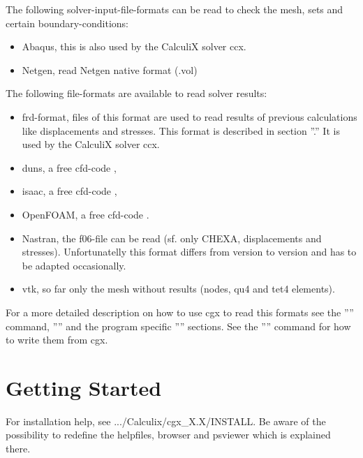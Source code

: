 \documentclass{article}
\begin{document}
The following solver-input-file-formats can be read to check the mesh, sets and certain boundary-conditions:
\begin{itemize}
\item Abaqus, this is also used by the CalculiX solver ccx.
\item Netgen, read Netgen native format (.vol)
\end{itemize}
The following file-formats are available to read solver results:
\begin{itemize}
\item frd-format, files of this format are used to read results of previous calculations like displacements and stresses. This format is described in section ''.'' It is used by the CalculiX solver ccx. 
\item duns, a free cfd-code \cite{duns},
\item isaac, a free cfd-code \cite{isaac},
\item OpenFOAM, a free cfd-code \cite{OpenFOAM}.
\item Nastran, the f06-file can be read (sf. only CHEXA, displacements and stresses). Unfortunatelly this format differs from version to version and has to be adapted occasionally.
\item vtk, so far only the mesh without results (nodes, qu4 and tet4 elements).
\end{itemize}
For a more detailed description on how to use cgx to read this formats see the '''' command, '''' and the program specific '''' sections.  See the '''' command for how to write them from cgx.


\section{\label{Getting Started}Getting Started}
For installation help, see .../Calculix/cgx\_X.X/INSTALL. Be aware of the possibility to redefine the helpfiles, browser and psviewer which is explained there.
\end{document}
